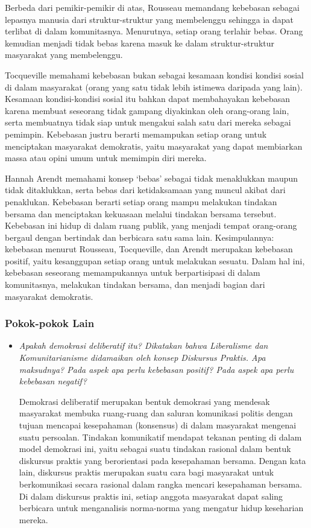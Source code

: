\documentclass[10pt,a4paper]{article}
\begin{document}
\begin{multicols}{2}
Berbeda dari pemikir-pemikir di atas, Rousseau memandang kebebasan
sebagai lepasnya manusia dari struktur-struktur yang membelenggu
sehingga ia dapat terlibat di dalam komunitasnya. Menurutnya, setiap
orang terlahir bebas. Orang kemudian menjadi tidak bebas karena masuk ke
dalam struktur-struktur masyarakat yang membelenggu.

Tocqueville memahami kebebasan bukan sebagai kesamaan kondisi kondisi
sosial di dalam masyarakat (orang yang satu tidak lebih istimewa
daripada yang lain). Kesamaan kondisi-kondisi sosial itu bahkan dapat
membahayakan kebebasan karena membuat seseorang tidak gampang diyakinkan
oleh orang-orang lain, serta membuatnya tidak siap untuk mengakui salah
satu dari mereka sebagai pemimpin. Kebebasan justru berarti memampukan
setiap orang untuk menciptakan masyarakat demokratis, yaitu masyarakat
yang dapat membiarkan massa atau opini umum untuk memimpin diri mereka.

Hannah Arendt memahami konsep `bebas' sebagai tidak menaklukkan maupun
tidak ditaklukkan, serta bebas dari ketidaksamaan yang muncul akibat
dari penaklukan. Kebebasan berarti setiap orang mampu melakukan tindakan
bersama dan menciptakan kekuasaan melalui tindakan bersama tersebut.
Kebebasan ini hidup di dalam ruang publik, yang menjadi tempat
orang-orang bergaul dengan bertindak dan berbicara satu sama lain.
Kesimpulannya: kebebasan menurut Rousseau, Tocqueville, dan Arendt
merupakan kebebasan positif, yaitu kesanggupan setiap orang untuk
melakukan sesuatu. Dalam hal ini, kebebasan seseorang memampukannya
untuk berpartisipasi di dalam komunitasnya, melakukan tindakan bersama,
dan menjadi bagian dari masyarakat demokratis.

\hypertarget{pokok-pokok-lain-4}{%
\subsubsection{Pokok-pokok Lain}\label{pokok-pokok-lain-4}}

\begin{itemize}
\item
  \emph{Apakah demokrasi deliberatif itu? Dikatakan bahwa Liberalisme
  dan Komunitarianisme didamaikan oleh konsep Diskursus Praktis. Apa
  maksudnya? Pada aspek apa perlu kebebasan positif? Pada aspek apa
  perlu kebebasan negatif?}

  Demokrasi deliberatif merupakan bentuk demokrasi yang mendesak
  masyarakat membuka ruang-ruang dan saluran komunikasi politis dengan
  tujuan mencapai kesepahaman (konsensus) di dalam masyarakat mengenai
  suatu persoalan. Tindakan komunikatif mendapat tekanan penting di
  dalam model demokrasi ini, yaitu sebagai suatu tindakan rasional dalam
  bentuk diskursus praktis yang berorientasi pada kesepahaman bersama.
  Dengan kata lain, diskursus praktis merupakan suatu cara bagi
  masyarakat untuk berkomunikasi secara rasional dalam rangka mencari
  kesepahaman bersama. Di dalam diskursus praktis ini, setiap anggota
  masyarakat dapat saling berbicara untuk menganalisis norma-norma yang
  mengatur hidup keseharian mereka.


\end{itemize}
\end{multicols}
\end{document}
